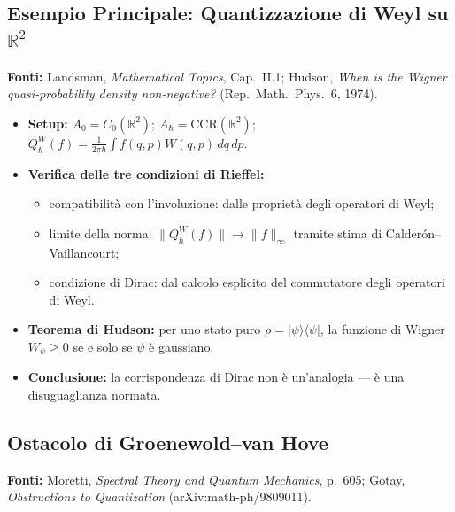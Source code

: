 \documentclass[12pt, a4paper]{article}
\newcommand{\fonti}[1]{%
	\begin{fontebox}
		\textcolor{fontecolor}{\footnotesize\textbf{Fonti:} #1}
	\end{fontebox}%
}
\begin{document}
	\subsection{Esempio Principale: Quantizzazione di Weyl su $\mathbb{R}^2$}
	
	\fonti{Landsman, \textit{Mathematical Topics}, Cap.~II.1;
		Hudson, \textit{When is the Wigner quasi-probability density non-negative?}
		(Rep.\ Math.\ Phys.\ 6, 1974).}
	
	\begin{itemize}
		\item \textbf{Setup:} $A_0=C_0(\mathbb{R}^2)$; $A_\hbar=\mathrm{CCR}(\mathbb{R}^2)$;
		$Q_\hbar^W(f)=\frac{1}{2\pi\hbar}\int f(q,p)W(q,p)\,dq\,dp$.
		\item \textbf{Verifica delle tre condizioni di Rieffel:}
		\begin{itemize}
			\item[(i)] compatibilità con l'involuzione: dalle proprietà degli operatori
			di Weyl;
			\item[(ii)] limite della norma: $\|Q_\hbar^W(f)\|\to\|f\|_\infty$ tramite
			stima di Calderón--Vaillancourt;
			\item[(iii)] condizione di Dirac: dal calcolo esplicito del commutatore
			degli operatori di Weyl.
		\end{itemize}
		\item \textbf{Teorema di Hudson:} per uno stato puro $\rho=|\psi\rangle\langle\psi|$,
		la funzione di Wigner $W_\psi\geq 0$ se e solo se $\psi$ è gaussiano.
		\item \textbf{Conclusione:} la corrispondenza di Dirac non è un'analogia ---
		è una disuguaglianza normata.
	\end{itemize}
	
	\subsection{Ostacolo di Groenewold--van Hove}
	
	\fonti{Moretti, \textit{Spectral Theory and Quantum Mechanics}, p.~605;
		Gotay, \textit{Obstructions to Quantization} (arXiv:math-ph/9809011).}
	
\end{document}
